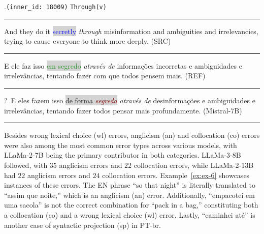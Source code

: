 \ex.\texttt{(inner\_id: 18009)} \hfill  \texttt{Through(v)}\\[0.3ex]
\noindent\rule{\linewidth}{0.9pt}
And they do it \colorbox{lightgray}{\textcolor{blue}{secretly}} \emph{through} misinformation and ambiguities and irrelevancies, trying to cause everyone to think more deeply. (SRC) \label{ex:ex-5} \\[-0.3ex]
\noindent\rule{\linewidth}{0.3pt}
E ele faz isso \colorbox{lightgray}{\textcolor{ForestGreen}{em segredo}} \emph{através de} informações incorretas e ambiguidades e irrelevâncias, tentando fazer com que todos pensem mais. (REF) \\[-0.3ex]
\noindent\rule{\linewidth}{0.3pt}
?~E eles fazem isso \colorbox{lightgray}{de forma \emph{\textcolor{Maroon}{segreda}}} \emph{através de} desinformações e ambiguidades e irrelevâncias, tentando fazer todos pensar mais profundamente. (Mistral-7B) \\[-0.3ex] 
\noindent\rule{\linewidth}{0.9pt}


Besides wrong lexical choice (wl) errors, anglicism (an) and collocation (co) errors were also among the most common error types across various models, with LLaMa-2-7B being the primary contributor in both categories. LLaMa-3-8B followed, with $35$ anglicism errors and $22$ collocation errors, while LLaMa-2-13B had $22$ anglicism errors and $24$ collocation errors. Example~\ref{ex:ex-6} showcases instances of these errors. The EN phrase ``so that night'' is literally translated to ``assim que noite,'' which is an anglicism (an) error. Additionally, ``empacotei em uma sacola'' is not the correct combination for ``pack in a bag,'' constituting both a collocation (co) and a wrong lexical choice (wl) error. Lastly, ``caminhei até'' is another case of syntactic projection (sp) in PT-br.


